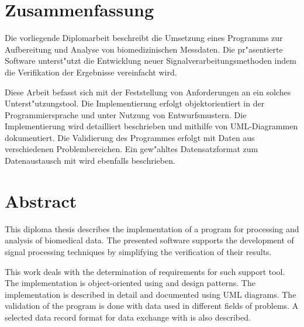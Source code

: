 \clearpage
\section*{Zusammenfassung}

Die vorliegende Diplomarbeit beschreibt die Umsetzung eines Programms zur Aufbereitung und Analyse von biomedizinischen Messdaten.
Die pr"asentierte Software unterst"utzt die Entwicklung neuer Signalverarbeitungsmethoden indem die Verifikation der Ergebnisse vereinfacht wird.

Diese Arbeit befasst sich mit der Feststellung von Anforderungen an ein solches Unterst"utzungstool.
Die Implementierung erfolgt objektorientiert in der Programmiersprache \java und unter Nutzung von Entwurfsmustern.
Die Implementierung wird detailliert beschrieben und mithilfe von UML-Diagrammen dokumentiert.
Die Validierung des Programmes erfolgt mit Daten aus verschiedenen Problembereichen.
Ein gew"ahltes Datensatzformat \us zum Datenaustausch mit \ml wird ebenfalls beschrieben.

\section*{Abstract}

This diploma thesis describes the implementation of a program for processing and analysis of biomedical data.
The presented software supports the development of signal processing techniques by simplifying the verification of their results.

This work deals with the determination of requirements for such support tool.
The implementation is object-oriented using \java and design patterns.
The implementation is described in detail and documented using UML diagrams.
The validation of the program is done with data used in different fields of problems.
A selected data record format \us for data exchange with \ml is also described.
